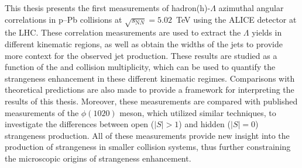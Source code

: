 This thesis presents the first measurements of hadron(h)-$\Lambda$ azimuthal angular correlations in p--Pb collisions at $\sqrt{s_{\mathrm NN}} = 5.02$~TeV using the ALICE detector at the LHC. These correlation measurements are used to extract the $\Lambda$ yields in different kinematic regions, as well as obtain the widths of the jets to provide more context for the observed jet production. These results are studied as a function of the \lmb \pt and collision multiplicity, which can be used to quantify the strangeness enhancement in these different kinematic regimes. Comparisons with theoretical predictions are also made to provide a framework for interpreting the results of this thesis. Moreover, these measurements are compared with published measurements of the $\phi(1020)$ meson, which utilized similar techniques, to investigate the differences between open ($|S| > 1$) and hidden ($|S| = 0$) strangeness production. All of these measurements provide new insight into the production of strangeness in smaller collision systems, thus further constraining the microscopic origins of strangeness enhancement.